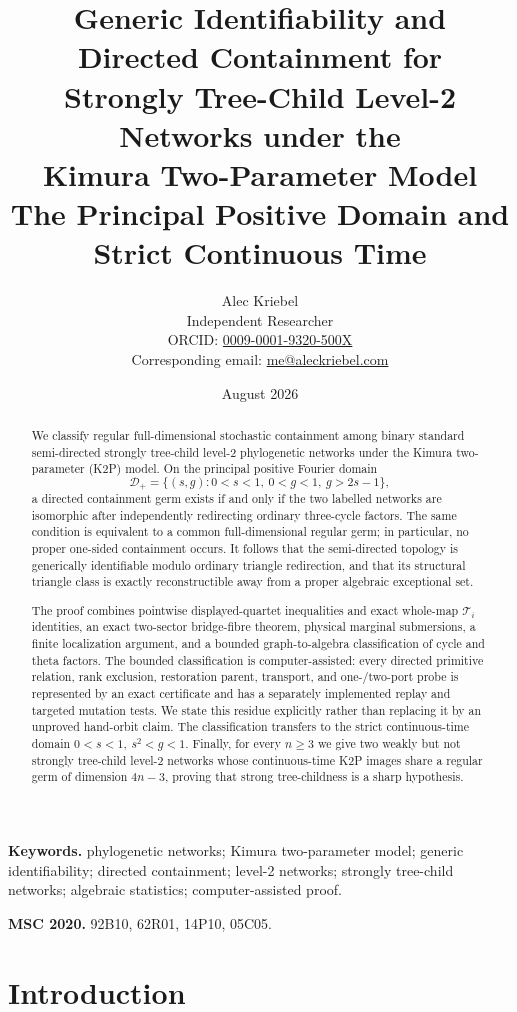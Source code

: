 \documentclass[11pt]{article}
\title{Generic Identifiability and Directed Containment for\\
Strongly Tree-Child Level-2 Networks under the\\
Kimura Two-Parameter Model\\
\large The Principal Positive Domain and Strict Continuous Time}
\author{Alec Kriebel\\
\small Independent Researcher\\
\small ORCID: \href{https://orcid.org/0009-0001-9320-500X}
{0009-0001-9320-500X}\\
\small Corresponding email: \href{mailto:me@aleckriebel.com}
{me@aleckriebel.com}}
\date{August 2026}
\theoremstyle{remark}
\newcommand{\Dplus}{\mathcal D_+}
\newcommand{\1}{\mathbf 1}
\begin{document}
\maketitle

\begin{abstract}
We classify regular full-dimensional stochastic containment among binary
standard semi-directed strongly tree-child level-2 phylogenetic networks
under the Kimura two-parameter (K2P) model.  On the principal positive
Fourier domain
\[
 \Dplus=\{(s,g):0<s<1,\ 0<g<1,\ g>2s-1\},
\]
a directed containment germ exists if and only if the two labelled networks
are isomorphic after independently redirecting ordinary three-cycle factors.
The same condition is equivalent to a common full-dimensional regular germ;
in particular, no proper one-sided containment occurs.  It follows that the
semi-directed topology is generically identifiable modulo ordinary triangle
redirection, and that its structural triangle class is exactly reconstructible
away from a proper algebraic exceptional set.

The proof combines pointwise displayed-quartet inequalities and exact
whole-map \(\mathcal T_i\) identities, an exact two-sector bridge-fibre
theorem, physical marginal submersions, a finite
localization argument, and a bounded graph-to-algebra classification of cycle
and theta factors.  The bounded classification is computer-assisted: every
directed primitive relation, rank exclusion, restoration parent, transport,
and one-/two-port probe is represented by an exact certificate and has a
separately implemented replay and targeted mutation tests.  We state this
residue explicitly rather than replacing it by an unproved hand-orbit claim.
The classification transfers to the strict continuous-time domain
\(0<s<1,\ s^2<g<1\).  Finally, for every \(n\ge3\) we give two weakly but not
strongly tree-child level-2 networks whose continuous-time K2P images share a
regular germ of dimension \(4n-3\), proving that strong tree-childness is a
sharp hypothesis.
\end{abstract}

\noindent\textbf{Keywords.} phylogenetic networks; Kimura two-parameter
model; generic identifiability; directed containment; level-2 networks;
strongly tree-child networks; algebraic statistics; computer-assisted proof.

\medskip
\noindent\textbf{MSC 2020.} 92B10, 62R01, 14P10, 05C05.

\section{Introduction}\label{sec:introduction}
\end{document}
